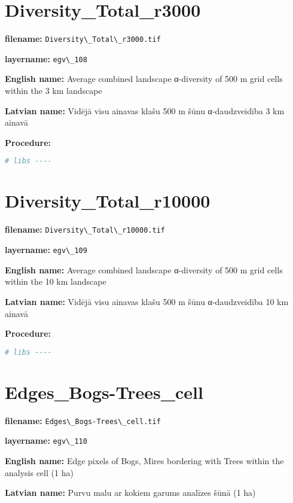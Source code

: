 \documentclass[
]{book}
\newcommand{\passthrough}[1]{#1}
\begin{document}
\section{Diversity\_Total\_r3000}\label{ch06.108}

\textbf{filename:} \passthrough{\lstinline!Diversity\_Total\_r3000.tif!}

\textbf{layername:} \passthrough{\lstinline!egv\_108!}

\textbf{English name:} Average combined landscape α-diversity of 500 m grid cells within the 3 km landscape

\textbf{Latvian name:} Vidējā visu ainavas klašu 500 m šūnu α-daudzveidība 3 km ainavā

\textbf{Procedure:}

\begin{lstlisting}[language=R]
# libs ----
\end{lstlisting}

\section{Diversity\_Total\_r10000}\label{ch06.109}

\textbf{filename:} \passthrough{\lstinline!Diversity\_Total\_r10000.tif!}

\textbf{layername:} \passthrough{\lstinline!egv\_109!}

\textbf{English name:} Average combined landscape α-diversity of 500 m grid cells within the 10 km landscape

\textbf{Latvian name:} Vidējā visu ainavas klašu 500 m šūnu α-daudzveidība 10 km ainavā

\textbf{Procedure:}

\begin{lstlisting}[language=R]
# libs ----
\end{lstlisting}

\section{Edges\_Bogs-Trees\_cell}\label{ch06.110}

\textbf{filename:} \passthrough{\lstinline!Edges\_Bogs-Trees\_cell.tif!}

\textbf{layername:} \passthrough{\lstinline!egv\_110!}

\textbf{English name:} Edge pixels of Bogs, Mires bordering with Trees within the analysis cell (1 ha)

\textbf{Latvian name:} Purvu malu ar kokiem garums analīzes šūnā (1 ha)
\end{document}
